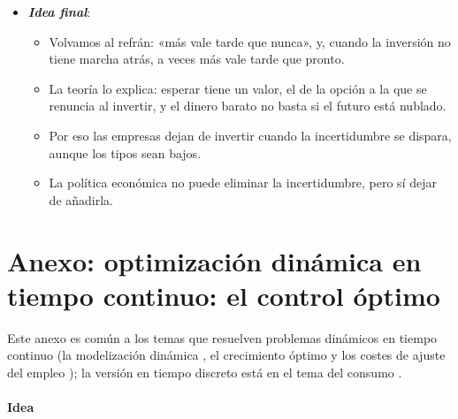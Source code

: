 \documentclass[11pt]{article}
\begin{document}
\begin{itemize}
\begin{itemize}
  \item Más que subvencionarlas, lo que más las favorece es una senda estable y creíble de precios del carbono y de regulación.
  \end{itemize}
\item \textbf{\emph{Idea final}}:
  \begin{itemize}
  \item Volvamos al refrán: «más vale tarde que nunca», y, cuando la inversión no tiene marcha atrás, a veces más vale tarde que pronto.

  \item La teoría lo explica: esperar tiene un valor, el de la opción a la que se renuncia al invertir, y el dinero barato no basta si el futuro está nublado.

  \item Por eso las empresas dejan de invertir cuando la incertidumbre se dispara, aunque los tipos sean bajos.

  \item La política económica no puede eliminar la incertidumbre, pero sí dejar de añadirla.
  \end{itemize}
\end{itemize}

\clearpage
\appendix

\section{Anexo: optimización dinámica en tiempo continuo:\cortetitulo{} el control óptimo}\label{anexo:control-optimo}

\begin{notaopositor}
Este anexo es común a los temas que resuelven problemas dinámicos en tiempo continuo (la modelización dinámica , el crecimiento óptimo  y los costes de ajuste del empleo ); la versión en tiempo discreto está en el tema del consumo .
\end{notaopositor}

\paragraph{Idea}
\end{document}
